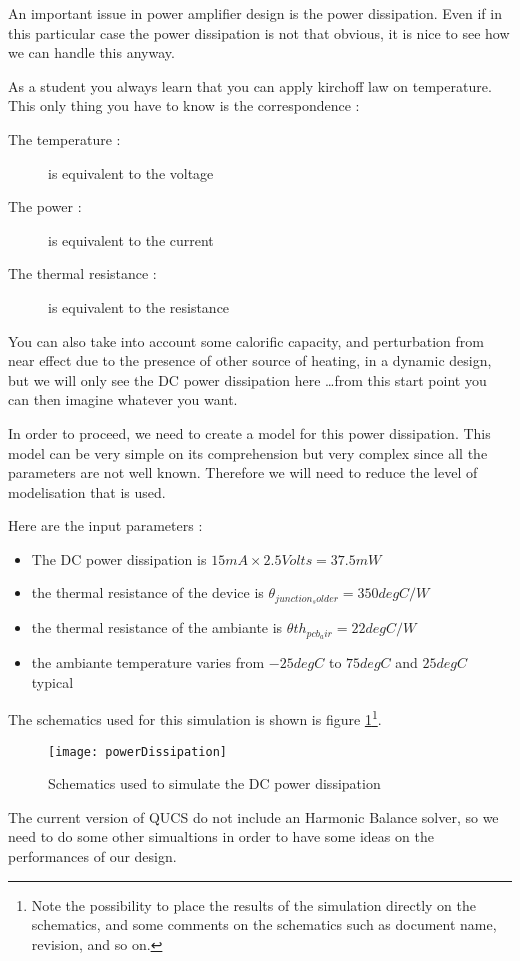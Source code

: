 
An important issue in power amplifier design is the power dissipation. Even if in this particular case the power dissipation is not that obvious, it is nice to see how we can handle this anyway.

\bigskip

As a student you always learn that you can apply kirchoff law on temperature. This only thing you have to know is the correspondence : 

\begin{description}
\item[The temperature : ] is equivalent to the voltage
\item[The power : ] is equivalent to the current 
\item[The thermal resistance : ] is equivalent to the resistance
\end{description}

You can also take into account some calorific capacity, and perturbation from near effect due to the presence of other source of heating, in a dynamic design, but we will only see the DC power dissipation here \ldots from this start point you can then imagine whatever you want.

\bigskip

In order to proceed, we need to create a model for this power dissipation. This model can be very simple on its comprehension but very complex since all the parameters are not well known. Therefore we will need to reduce the level of modelisation that is used.

Here are the input parameters :
\begin{itemize}
\item The DC power dissipation is $15 mA \times 2.5 Volts = 37.5 mW $
\item the thermal resistance of the device is $\theta_{junction_solder}=350 degC/W$
\item the thermal resistance of the ambiante is $\theta th_{pcb_air}=22 degC/W$
\item the ambiante temperature varies from $-25 degC$ to $75 degC$ and $25 degC$ typical
\end{itemize}


The schematics used for this simulation is shown is figure \ref{design:pa:bias:DCpower}\footnote{Note the possibility to place the results of the simulation directly on the schematics, and some comments on the schematics such as document name, revision, and so on.}.

\begin{figure}[htbp]
\begin{center}
	\texttt{[image: powerDissipation]}
	\caption{Schematics used to simulate the DC power dissipation}
	\label{design:pa:bias:DCpower}
\end{center}
\end{figure}



The current version of QUCS do not include an Harmonic Balance solver, so we need to do some other simualtions in order to have some ideas on the performances of our design.
